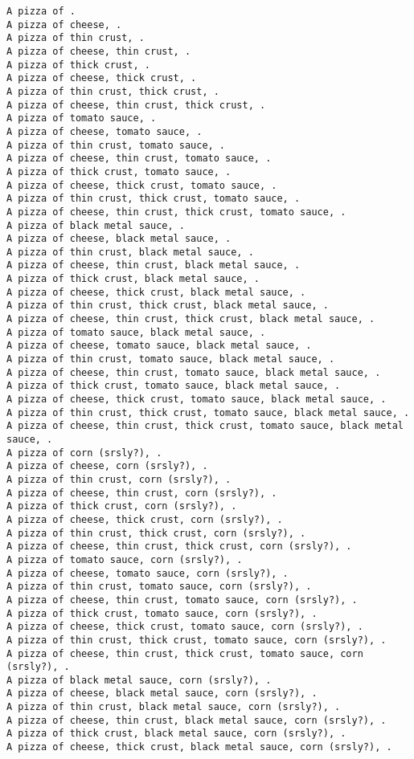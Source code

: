 \documentclass[11pt]{article}
\begin{document}
\begin{enumerate}
\begin{verbatim}
A pizza of .
A pizza of cheese, .
A pizza of thin crust, .
A pizza of cheese, thin crust, .
A pizza of thick crust, .
A pizza of cheese, thick crust, .
A pizza of thin crust, thick crust, .
A pizza of cheese, thin crust, thick crust, .
A pizza of tomato sauce, .
A pizza of cheese, tomato sauce, .
A pizza of thin crust, tomato sauce, .
A pizza of cheese, thin crust, tomato sauce, .
A pizza of thick crust, tomato sauce, .
A pizza of cheese, thick crust, tomato sauce, .
A pizza of thin crust, thick crust, tomato sauce, .
A pizza of cheese, thin crust, thick crust, tomato sauce, .
A pizza of black metal sauce, .
A pizza of cheese, black metal sauce, .
A pizza of thin crust, black metal sauce, .
A pizza of cheese, thin crust, black metal sauce, .
A pizza of thick crust, black metal sauce, .
A pizza of cheese, thick crust, black metal sauce, .
A pizza of thin crust, thick crust, black metal sauce, .
A pizza of cheese, thin crust, thick crust, black metal sauce, .
A pizza of tomato sauce, black metal sauce, .
A pizza of cheese, tomato sauce, black metal sauce, .
A pizza of thin crust, tomato sauce, black metal sauce, .
A pizza of cheese, thin crust, tomato sauce, black metal sauce, .
A pizza of thick crust, tomato sauce, black metal sauce, .
A pizza of cheese, thick crust, tomato sauce, black metal sauce, .
A pizza of thin crust, thick crust, tomato sauce, black metal sauce, .
A pizza of cheese, thin crust, thick crust, tomato sauce, black metal sauce, .
A pizza of corn (srsly?), .
A pizza of cheese, corn (srsly?), .
A pizza of thin crust, corn (srsly?), .
A pizza of cheese, thin crust, corn (srsly?), .
A pizza of thick crust, corn (srsly?), .
A pizza of cheese, thick crust, corn (srsly?), .
A pizza of thin crust, thick crust, corn (srsly?), .
A pizza of cheese, thin crust, thick crust, corn (srsly?), .
A pizza of tomato sauce, corn (srsly?), .
A pizza of cheese, tomato sauce, corn (srsly?), .
A pizza of thin crust, tomato sauce, corn (srsly?), .
A pizza of cheese, thin crust, tomato sauce, corn (srsly?), .
A pizza of thick crust, tomato sauce, corn (srsly?), .
A pizza of cheese, thick crust, tomato sauce, corn (srsly?), .
A pizza of thin crust, thick crust, tomato sauce, corn (srsly?), .
A pizza of cheese, thin crust, thick crust, tomato sauce, corn (srsly?), .
A pizza of black metal sauce, corn (srsly?), .
A pizza of cheese, black metal sauce, corn (srsly?), .
A pizza of thin crust, black metal sauce, corn (srsly?), .
A pizza of cheese, thin crust, black metal sauce, corn (srsly?), .
A pizza of thick crust, black metal sauce, corn (srsly?), .
A pizza of cheese, thick crust, black metal sauce, corn (srsly?), .

\end{verbatim}
\end{enumerate}
\end{document}
